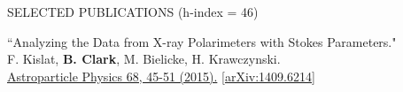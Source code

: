 \documentclass{resume} %
\begin{document}
\begin{rSection}{SELECTED PUBLICATIONS (h-index = 46)}
\begin{etaremune}

   \item ``Analyzing the Data from X-ray Polarimeters with Stokes Parameters." \\
 F. Kislat,  \textbf{B. Clark}, M. Bielicke, H. Krawczynski.  \\
  \href{http://dx.doi.org/10.1016/j.astropartphys.2015.02.007}{Astroparticle Physics 68, 45-51 (2015).} \href{https://arxiv.org/abs/1409.6214}{[arXiv:1409.6214]} 
  


 \end{etaremune}
 
\end{rSection}



\end{document}
